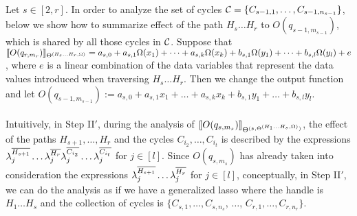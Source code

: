 Let $s\in [2,r]$. In order to analyze the set of cycles ${\mathcal{C} }=\{C_{s-1,1},\dots,C_{s-1,n_{s-1}}\}$, below we show how to summarize effect of the path $H_s\dots H_r$ to $O(q_{s-1, m_{s-1}})$, which is shared by all those cycles in ${\mathcal{C} }$.
Suppose that $\llbracket O(q_{r,m_r})\rrbracket_{\Theta^{(H_s\dots H_{r}, \Omega)}}=a_{s, 0}+a_{s, 1} \Omega(x_1)+ \dots + a_{s, k} \Omega(x_k) + b_{s,1} \Omega(y_1) + \dots + b_{s, l} \Omega(y_l)+e$, where $e$ is a linear combination of the data variables that represent the data values introduced when traversing $H_s\dots H_r$. 
Then we change the output function and let
$O(q_{s-1, m_{s-1}}):=a_{s, 0}+a_{s, 1} x_1 + \dots + a_{s, k} x_k + b_{s,1} y_1 + \dots + b_{s, l} y_l$.\smallskip\\
\bigskip\\
Intuitively, in Step II$'$, during the analysis of $\llbracket O(q_{s, m_{s}})\rrbracket_{\Theta^{({\mathfrak{s} },\Theta^{(H_1 \dots H_{s}, \Omega)} ) } }$, the effect of the paths $H_{s+1},  \dots,  H_r$ and the cycles $C_{i_{2}}, \dots, C_{i_{t}}$ is described by the expressions $\lambda^{\overline{H_{s+1}}}_j \dots \lambda^{\overline{H_{r}}}_j  \lambda^{\overline{C_{i_{2}}}}_j \dots \lambda^{\overline{C_{i_{t}}}}_j $ for $j \in [l]$. Since $O(q_{s, m_{s}})$ has already taken into consideration the expressions $\lambda^{\overline{H_{s+1}}}_j \dots \lambda^{\overline{H_{r}}}_j$ for $j \in [l]$, conceptually, in Step II$'$, we can do the analysis as if we have a generalized lasso where the handle is $H_1\dots H_s$ and the collection of cycles is $\{C_{s,1},\dots, C_{s,n_s}$, $\dots$, $C_{r,1},\dots, C_{r,n_r}\}$. 
